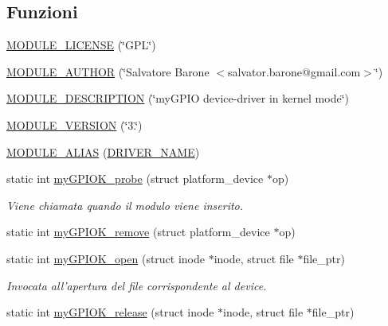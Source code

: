 \subsection*{Funzioni}
\begin{DoxyCompactItemize}
\item 
\hyperlink{group___linux-_driver_gad94b36675e7eb067ea3ce6ff9e244a44}{M\+O\+D\+U\+L\+E\+\_\+\+L\+I\+C\+E\+N\+S\+E} (\char`\"{}G\+P\+L\char`\"{})
\item 
\hyperlink{group___linux-_driver_gaa528ef168ff30340d38c46a12fce906b}{M\+O\+D\+U\+L\+E\+\_\+\+A\+U\+T\+H\+O\+R} (\char`\"{}Salvatore Barone $<$salvator.\+barone@gmail.\+com$>$\char`\"{})
\item 
\hyperlink{group___linux-_driver_ga1a0de0abbfec8f65abc50ccd3a549a4d}{M\+O\+D\+U\+L\+E\+\_\+\+D\+E\+S\+C\+R\+I\+P\+T\+I\+O\+N} (\char`\"{}my\+G\+P\+I\+O device-\/driver in kernel mode\char`\"{})
\item 
\hyperlink{group___linux-_driver_ga4d0a47b4ff404d7ced2610438ec9802e}{M\+O\+D\+U\+L\+E\+\_\+\+V\+E\+R\+S\+I\+O\+N} (\char`\"{}3.\char`\"{})
\item 
\hyperlink{group___linux-_driver_ga1681c4acdb2692baf523dbf58f940399}{M\+O\+D\+U\+L\+E\+\_\+\+A\+L\+I\+A\+S} (\hyperlink{group___linux-_driver_ga25634d21648ca7fb7a2aca614bafaaeb}{D\+R\+I\+V\+E\+R\+\_\+\+N\+A\+M\+E})
\item 
static int \hyperlink{group___linux-_driver_gae40973a06d72f7c41a9af07513a62307}{my\+G\+P\+I\+O\+K\+\_\+probe} (struct platform\+\_\+device $\ast$op)
\begin{DoxyCompactList}\small\item\em Viene chiamata quando il modulo viene inserito. \end{DoxyCompactList}\item 
static int \hyperlink{group___linux-_driver_ga59fddfaa36dea357f4bbdfceb0f47f8c}{my\+G\+P\+I\+O\+K\+\_\+remove} (struct platform\+\_\+device $\ast$op)
\item 
static int \hyperlink{group___linux-_driver_gad013759c18fbf6ea96005b9b3bfa5b4e}{my\+G\+P\+I\+O\+K\+\_\+open} (struct inode $\ast$inode, struct file $\ast$file\+\_\+ptr)
\begin{DoxyCompactList}\small\item\em Invocata all'apertura del file corrispondente al device. \end{DoxyCompactList}\item 
static int \hyperlink{group___linux-_driver_ga17ce7f574723246c790b70b06e3e7103}{my\+G\+P\+I\+O\+K\+\_\+release} (struct inode $\ast$inode, struct file $\ast$file\+\_\+ptr)

\end{DoxyCompactItemize}

